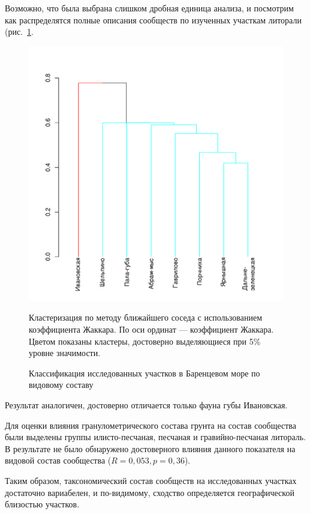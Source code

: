 Возможно, что была выбрана слишком дробная единица анализа, и посмотрим как распределятся полные описания сообществ по изученных участкам литорали (рис.~\ref{ris:cluster_barents_species_sites}. 
	\begin{figure}[p]
		\begin{center}
			\includegraphics{../Barenc_Sea/soobshestvo/Barents_fauna_sites_jaccard_single_1.pdf}
		\end{center}
	\caption{Классификация исследованных участков в Баренцевом море по видовому составу}
	\label{ris:cluster_barents_species_sites}

	\footnotesize{Кластеризация по методу ближайшего соседа с использованием коэффициента Жаккара. По оси ординат --- коэффициент Жаккара. Цветом показаны кластеры, достоверно выделяющиеся при 5\% уровне значимости.}
	\end{figure}
Результат аналогичен, достоверно отличается только фауна губы Ивановская.


Для оценки влияния гранулометрического состава грунта на состав сообщества были выделены группы илисто-песчаная, песчаная и гравийно-песчаная литораль. 
В результате не было обнаружено достоверного влияния данного показателя на видовой состав сообщества ($R=0,053, p=0,36$).
	
Таким образом, таксономический состав сообществ на исследованных участках достаточно вариабелен, и по-видимому, сходство определяется географической близостью участков. 

\afterpage{\clearpage}

